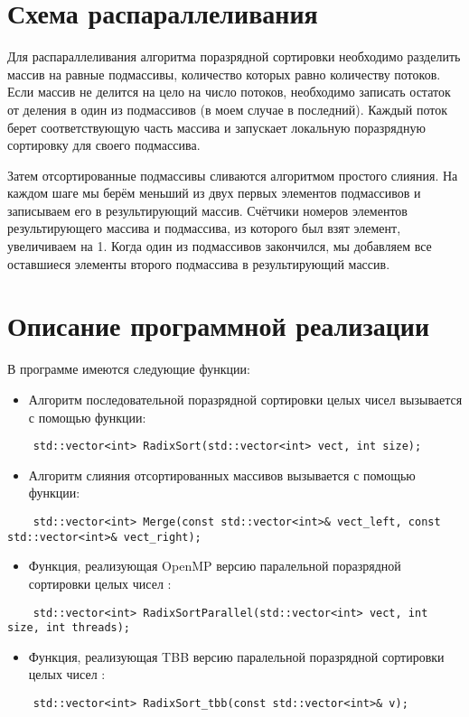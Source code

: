 \documentclass{report}
\begin{document}
\section*{Схема распараллеливания}
Для распараллеливания алгоритма поразрядной сортировки необходимо разделить массив на равные подмассивы, количество которых равно количеству потоков. Если массив не делится на цело на число потоков, необходимо записать остаток от деления в один из подмассивов (в моем случае в последний). Каждый поток берет соответствующую часть массива и запускает локальную поразрядную сортировку для своего подмассива.
\par Затем отсортированные подмассивы сливаются алгоритмом простого слияния. На каждом шаге мы берём меньший из двух первых элементов подмассивов и записываем его в результирующий массив. Счётчики номеров элементов результирующего массива и подмассива, из которого был взят элемент, увеличиваем на 1. Когда один из подмассивов закончился, мы добавляем все оставшиеся элементы второго подмассива в результирующий массив.
\newpage

\section*{Описание программной реализации}
В программе имеются следующие функции:

\begin{itemize}
\item Алгоритм последовательной поразрядной сортировки целых чисел вызывается с помощью функции:
\end{itemize}
\begin{lstlisting}
	std::vector<int> RadixSort(std::vector<int> vect, int size);
\end{lstlisting}
\begin{itemize}
\item Алгоритм слияния отсортированных массивов вызывается с помощью функции:
\end{itemize}
\begin{lstlisting}
	std::vector<int> Merge(const std::vector<int>& vect_left, const std::vector<int>& vect_right);
\end{lstlisting}
\begin{itemize}
\item Функция, реализующая OpenMP версию паралельной поразрядной сортировки целых чисел : 
\end{itemize}
\begin{lstlisting}
	std::vector<int> RadixSortParallel(std::vector<int> vect, int size, int threads);
\end{lstlisting}
\begin{itemize}
\item Функция, реализующая TBB версию паралельной поразрядной сортировки целых чисел : 
\end{itemize}
\begin{lstlisting}
	std::vector<int> RadixSort_tbb(const std::vector<int>& v);
\end{lstlisting}
\newpage
\end{document}
